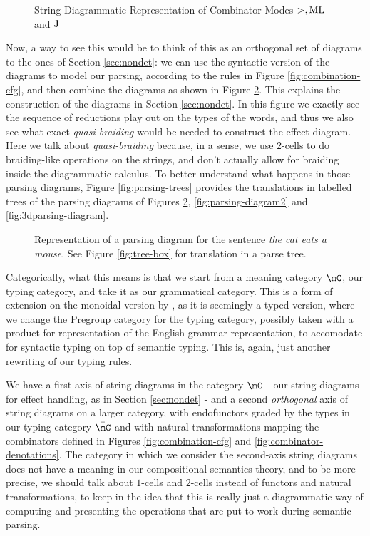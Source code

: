 \begin{figure}
	\centering
	\caption{String Diagrammatic Representation of Combinator Modes $>, \text{ML}$ and $\text{J}$}
	\label{fig:combinator-sd}
\end{figure}

Now, a way to see this would be to think of this as an orthogonal set of
diagrams to the ones of Section \ref{sec:nondet}: we can use the syntactic
version of the diagrams to model our parsing, according to the rules in
Figure \ref{fig:combination-cfg}, and then combine the diagrams as shown in
Figure \ref{fig:parsing-diagram}.
This explains the construction of the diagrams in Section \ref{sec:nondet}.
In this figure we exactly see the sequence of reductions play out on the types
of the words, and thus we also see what exact \emph{quasi-braiding} would be
needed to construct the effect diagram.
Here we talk about \emph{quasi-braiding} because, in a sense, we use $2$-cells
to do braiding-like operations on the strings, and don't actually allow for
braiding inside the diagrammatic calculus.
To better understand what happens in those parsing diagrams, Figure
\ref{fig:parsing-trees} provides the translations in labelled trees of the
parsing diagrams of Figures \ref{fig:parsing-diagram},
\ref{fig:parsing-diagram2} and \ref{fig:3dparsing-diagram}.


\begin{figure}
	\centering
	\caption{Representation of a parsing diagram for the sentence
		\emph{the cat eats a mouse}.
		See Figure \ref{fig:tree-box} for translation in a parse tree.}
	\label{fig:parsing-diagram}
\end{figure}

Categorically, what this means is that we start from a meaning category $\mC$,
our typing category, and take it as our grammatical category.
This is a form of extension on the monoidal version by
\cite{coeckeMathematicalFoundationsCompositional2010}, as it is seemingly a
typed version, where we change the Pregroup category for the typing category,
possibly taken with a product for representation of the English grammar
representation, to accomodate for syntactic typing on top of semantic typing.
This is, again, just another rewriting of our typing rules.

We have a first axis of string diagrams in the category
$\mC$ - our string diagrams for effect handling, as in Section
\ref{sec:nondet} - and a second \emph{orthogonal} axis of string diagrams
on a larger category, with endofunctors graded by the types in our typing
category $\bar{\mC}$ and with natural transformations mapping the combinators
defined in Figures \ref{fig:combination-cfg} and
\ref{fig:combinator-denotations}.
The category in which we consider the second-axis string diagrams does not have
a meaning in our compositional semantics theory, and to be more precise, we
should talk about $1$-cells and $2$-cells instead of functors and natural
transformations, to keep in the idea that this is really just a diagrammatic
way of computing and presenting the operations that are put to work during
semantic parsing.

